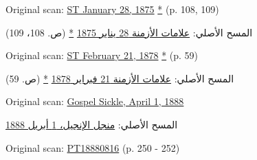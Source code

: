 

Original scan: \href{https://documents.adventistarchives.org/Periodicals/ST/ST18750128-V01-14.pdf#search=ST18750128}{ST January 28, 1875} \href{https://forgotten-pillar.s3.us-east-2.amazonaws.com/ST18750128-V01-14.pdf}{*} (p. 108, 109)


المسح الأصلي: \href{https://documents.adventistarchives.org/Periodicals/ST/ST18750128-V01-14.pdf#search=ST18750128}{علامات الأزمنة 28 يناير 1875} \href{https://forgotten-pillar.s3.us-east-2.amazonaws.com/ST18750128-V01-14.pdf}{*} (ص. 108، 109)






Original scan: \href{https://documents.adventistarchives.org/Periodicals/ST/ST18780221-V04-08.pdf#search=%22As%20already%20stated%2C%20S%2E%20D%2E%20Adventists%22}{ST February 21, 1878} \href{https://forgotten-pillar.s3.us-east-2.amazonaws.com/ST18780221-V04-08.pdf}{*} (p. 59)


المسح الأصلي: \href{https://documents.adventistarchives.org/Periodicals/ST/ST18780221-V04-08.pdf#search=%22As%20already%20stated%2C%20S%2E%20D%2E%20Adventists%22}{علامات الأزمنة 21 فبراير 1878} \href{https://forgotten-pillar.s3.us-east-2.amazonaws.com/ST18780221-V04-08.pdf}{*} (ص. 59)






Original scan: \href{https://adventistdigitallibrary.org/adl-410336/gospel-sickle-april-1-1888?view_only=true&solr_nav%5Bid%5D=ff4d7f3f77b9bdf9e9ac&solr_nav%5Bpage%5D=0&solr_nav%5Boffset%5D=6}{Gospel Sickle, April 1, 1888}


المسح الأصلي: \href{https://adventistdigitallibrary.org/adl-410336/gospel-sickle-april-1-1888?view_only=true&solr_nav%5Bid%5D=ff4d7f3f77b9bdf9e9ac&solr_nav%5Bpage%5D=0&solr_nav%5Boffset%5D=6}{منجل الإنجيل، 1 أبريل 1888}






Original scan: \href{https://adventistdigitallibrary.org/adl-402854/present-truth-august-16-1888?view_only=true&solr_nav%5Bid%5D=ff4d7f3f77b9bdf9e9ac&solr_nav%5Bpage%5D=0&solr_nav%5Boffset%5D=13}{PT18880816} (p. 250 - 252)


